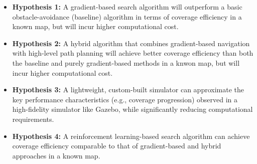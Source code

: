 \begin{itemize}
    \item \textbf{Hypothesis 1:} A gradient-based search algorithm will outperform a basic obstacle-avoidance (baseline) algorithm in terms of coverage efficiency in a known map, but will incur higher computational cost.
    \item \textbf{Hypothesis 2:} A hybrid algorithm that combines gradient-based navigation with high-level path planning will achieve better coverage efficiency than both the baseline and purely gradient-based methods in a knwon map, but will incur higher computational cost.
    \item \textbf{Hypothesis 3:} A lightweight, custom-built simulator can approximate the key performance characteristics (e.g., coverage progression) observed in a high-fidelity simulator like Gazebo, while significantly reducing computational requirements.
    \item {\color{red}\textbf{Hypothesis 4:} A reinforcement learning-based search algorithm can achieve coverage efficiency comparable to that of gradient-based and hybrid approaches in a known map.}
\end{itemize}
